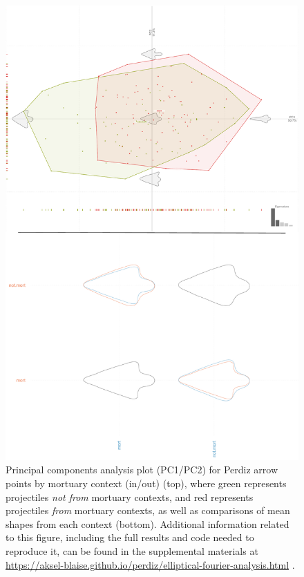 \documentclass[review]{elsarticle}
\begin{document}
\begin{figure}[!]\centering
\includegraphics[width=0.85\linewidth]{context.pdf}
\caption{Principal components analysis plot (PC1/PC2) for Perdiz arrow points by mortuary context (in/out) (top), where green represents projectiles \textit{not from} mortuary contexts, and red represents projectiles \textit{from} mortuary contexts, as well as comparisons of mean shapes from each context (bottom). Additional information related to this figure, including the full results and code needed to reproduce it, can be found in the supplemental materials at \href{https://aksel-blaise.github.io/perdiz/elliptical-fourier-analysis.html}{https://aksel-blaise.github.io/perdiz/elliptical-fourier-analysis.html} \citep{RN8980}.}
\label{fig:gmcontext}
\end{figure}
\end{document}
